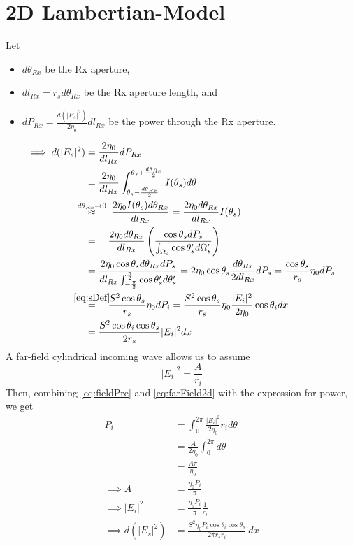 \documentclass{article}
\begin{document}
\section{2D Lambertian-Model}
Let 
\begin{itemize}
   \item $d \theta_{Rx}$ be the Rx aperture,
   \item $d l_{Rx} = r_s d \theta_{Rx}$ be the Rx aperture length, and
   \item $d P_{Rx} = \frac{d(|E_s|^2)}{2 \eta_0} dl_{Rx}$ be the power through the Rx
      aperture.
\end{itemize}
\begin{align}
   \implies d(|E_s|^2) &= \frac{2 \eta_0 }{dl_{Rx}} dP_{Rx} \nonumber \\
   &= \frac{2 \eta_0 }{dl_{Rx}} \int_{\theta_{s} - \frac{d
      \theta_{Rx}}{2}}^{\theta_{s} + \frac{d \theta_{Rx}}{2}} I( \theta_s ) d \theta
      \nonumber \\
   &\overset{\mathclap{d \theta_{Rx} \to 0}}{\approx} \ \ \ \ \frac{2 \eta_0
      I(\theta_s) d \theta_{Rx}}{dl_{Rx}} = \frac{2 \eta_0 d \theta_{Rx}}{dl_{Rx}}
      I(\theta_s) \nonumber \\
   &\overset{\mathclap{}}{=} \ \ \ \frac{2 \eta_0
      d \theta_{Rx}}{dl_{Rx}} \left( \frac{\cos \theta_s dP_s}{ \int_{\Omega_s} \cos
      \theta_s' d \Omega_s' } \right) \nonumber \\ 
   &= \frac{2 \eta_0 \cos \theta_s d \theta_{Rx} d P_s}{dl_{Rx}
      \int_{-\frac{\pi}{2}}^{\frac{\pi}{2}} \cos \theta_s' d \theta_s'} = 2 \eta_0 
      \cos \theta_{s} \frac{ d \theta_{Rx} }{2 dl_{Rx} } d P_s = \frac{\cos
      \theta_s}{r_s} \eta_0 dP_s \nonumber \\
   &\overset{\mathclap{\eqref{eq:sDef}}}{=} \ \ \ \frac{S^2 \cos \theta_s}{r_s}
      \eta_0 dP_i = \frac{S^2 \cos \theta_s}{r_s} \eta_0\frac{|E_i|^2}{2 \eta_0} \cos
      \theta_i dx \nonumber \\ 
   &= \frac{S^2 \cos \theta_i \cos \theta_s}{2r_s} |E_i|^2 dx
   \label{eq:fieldPre}
\end{align}
A far-field cylindrical incoming wave allows us to assume 
\begin{equation}
   |E_i|^2 = \frac{A}{r_i}
   \label{eq:farField2d}
\end{equation}
Then, combining \eqref{eq:fieldPre} and \eqref{eq:farField2d} with the
expression for power, we get
\begin{align}
   P_i &= \int_0^{2 \pi} \frac{|E_i|^2}{2 \eta_0} r_i d \theta \nonumber \\
   &= \frac{A}{2 \eta_0} \int_0^{2 \pi} d \theta \nonumber \\ 
   &= \frac{A \pi}{\eta_0} \nonumber \\
   \implies A &= \frac{\eta_0 P_i}{\pi} \nonumber \\
   \implies |E_i|^2 &= \frac{\eta_o P_i}{\pi} \frac{1}{r_i} \nonumber \\
   \implies d(|E_s|^2) &= \frac{S^2 \eta_0 P_i \cos \theta_i \cos \theta_s }{2 \pi
      r_s r_i} \ dx
   \label{eq:fieldMagEq1}
\end{align}
\end{document}
